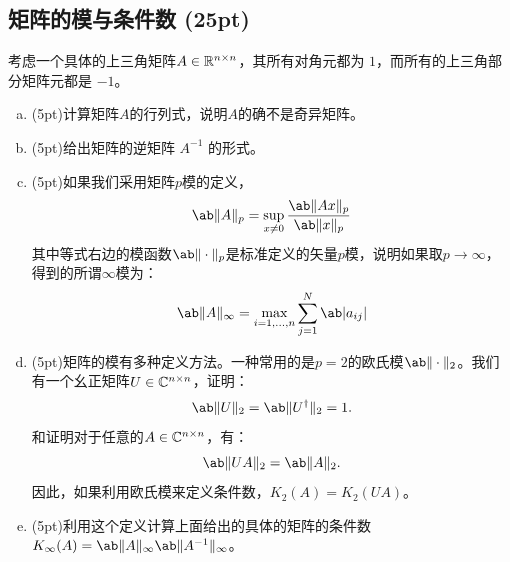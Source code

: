 \documentclass[12pt, a4paper, oneside]{article}
\begin{document}
\subsection{矩阵的模与条件数 (25pt)}
考虑一个具体的上三角矩阵$A\in\mathbb{R}^{n\times n}$，其所有对角元都为 $1$，而所有的上三角部分矩阵元都是 −$1$。
\begin{enumerate}[(a)]
\item (5pt)计算矩阵$A$的行列式，说明$A$的确不是奇异矩阵。
\item (5pt)给出矩阵的逆矩阵 $A^{-1}$ 的形式。
\item (5pt)如果我们采用矩阵$p$模的定义，
\begin{equation}\label{eq:3}
    \norm{A}_p=\sup_{x\neq0}{\frac{\norm{Ax}_p}{\norm{x}_p}}
\end{equation}
其中等式右边的模函数$\norm{\cdot}_p$是标准定义的矢量$p$模，说明如果取$p\rightarrow\infty$，得到的所谓$\infty$模为：
\begin{equation}\label{eq:4}
    \norm{A}_\infty=\max_{i=1,...,n}\sum_{j=1}^N{\abs{a_{ij}}}
\end{equation}
\item (5pt)矩阵的模有多种定义方法。一种常用的是$p=2$的欧氏模$\norm{\cdot}_2$。我们有一个幺正矩阵$U\in\mathbb{C}^{n\times n}$，证明：
\begin{equation}\label{eq:5}
    \norm{U}_2=\norm{U^\dagger}_2=1.
\end{equation}
和证明对于任意的$A\in\mathbb{C}^{n\times n}$，有：
\begin{equation}
    \norm{UA}_2=\norm{A}_2.
\end{equation}
因此，如果利用欧氏模来定义条件数，$K_2(A)=K_2(UA)$。
\item (5pt)利用这个定义计算上面给出的具体的矩阵的条件数$K_\infty(A)=\norm{A}_\infty\norm{A^{-1}}_\infty$。
\end{enumerate}
\end{document}
